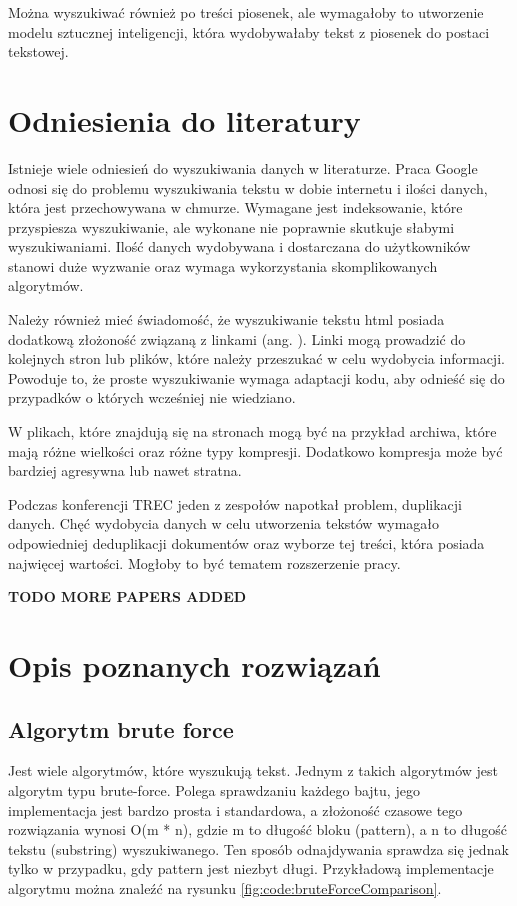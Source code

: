 Można wyszukiwać również po treści piosenek, ale wymagałoby to utworzenie modelu
sztucznej inteligencji, która wydobywałaby tekst z piosenek do postaci tekstowej.

\section{Odniesienia do literatury}

Istnieje wiele odniesień do wyszukiwania danych w literaturze. Praca Google 
\cite{bib:internet:htmlSearchGoogle} odnosi się do problemu wyszukiwania tekstu 
w dobie internetu i ilości danych, która jest przechowywana w chmurze. Wymagane
jest indeksowanie, które przyspiesza wyszukiwanie, ale wykonane nie poprawnie 
skutkuje słabymi wyszukiwaniami. Ilość danych wydobywana i dostarczana do
użytkowników stanowi duże wyzwanie oraz wymaga wykorzystania skomplikowanych 
algorytmów. 

Należy również mieć świadomość, że wyszukiwanie tekstu html posiada dodatkową 
złożoność związaną z linkami (ang. ). Linki mogą prowadzić do 
kolejnych stron lub plików, które należy przeszukać w celu wydobycia informacji.
Powoduje to, że proste wyszukiwanie wymaga adaptacji kodu, aby odnieść się do 
przypadków o których wcześniej nie wiedziano.

W plikach, które znajdują się na stronach mogą być na przykład archiwa, które
mają różne wielkości oraz różne typy kompresji. Dodatkowo kompresja może być 
bardziej agresywna lub nawet stratna.

Podczas konferencji TREC \cite{bib:konferencja:TRECDuplicates} jeden z zespołów 
napotkał problem, duplikacji danych. Chęć wydobycia danych w celu utworzenia
tekstów wymagało odpowiedniej deduplikacji dokumentów oraz wyborze tej treści,
która posiada najwięcej wartości. Mogłoby to być tematem rozszerzenie pracy. 

\textbf{TODO MORE PAPERS ADDED}

\section{Opis poznanych rozwiązań}
\subsection{Algorytm brute force}

Jest wiele algorytmów, które wyszukują tekst. Jednym z takich algorytmów jest 
algorytm typu brute-force. Polega sprawdzaniu każdego bajtu, jego implementacja
jest bardzo prosta i standardowa, a złożoność czasowe tego rozwiązania wynosi
O(m * n), gdzie m to długość bloku (pattern), a n to długość tekstu (substring) 
wyszukiwanego. Ten sposób odnajdywania sprawdza się jednak tylko w przypadku,
gdy pattern jest niezbyt długi. Przykładową implementacje algorytmu można 
znaleźć na rysunku \ref{fig:code:bruteForceComparison}.

